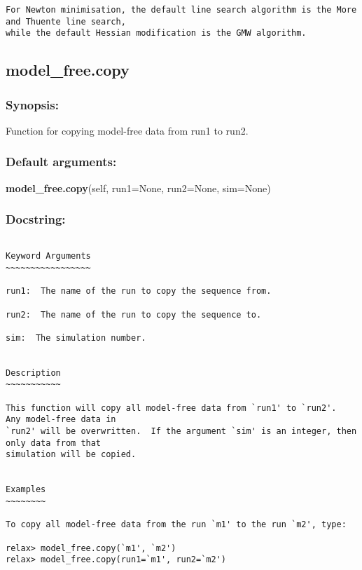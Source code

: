 {\begin{verbatim}
For Newton minimisation, the default line search algorithm is the More and Thuente line search,
while the default Hessian modification is the GMW algorithm.
\end{verbatim}
}



\newpage

\subsection{model\_free.copy}


\subsubsection{Synopsis:}

Function for copying model-free data from run1 to run2.

\subsubsection{Default arguments:}

\textsf{\textbf{model\_free.copy}(self, run1=None, run2=None, sim=None)
}


\subsubsection{Docstring:}

{\scriptsize
\begin{verbatim}

Keyword Arguments
~~~~~~~~~~~~~~~~~

run1:  The name of the run to copy the sequence from.

run2:  The name of the run to copy the sequence to.

sim:  The simulation number.


Description
~~~~~~~~~~~

This function will copy all model-free data from `run1' to `run2'.  Any model-free data in
`run2' will be overwritten.  If the argument `sim' is an integer, then only data from that
simulation will be copied.


Examples
~~~~~~~~

To copy all model-free data from the run `m1' to the run `m2', type:

relax> model_free.copy(`m1', `m2')
relax> model_free.copy(run1=`m1', run2=`m2')
\end{verbatim}
}



